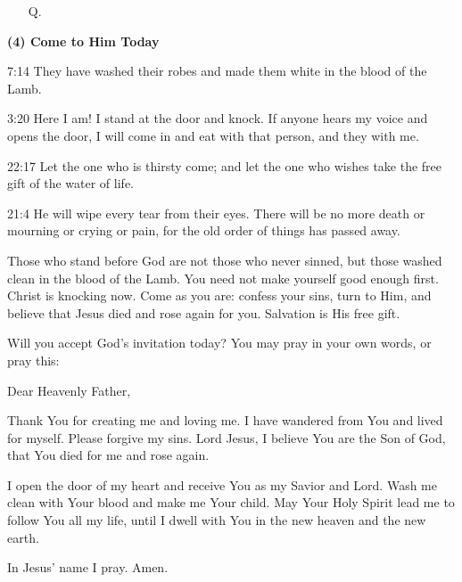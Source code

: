 \begin{center}
\begin{tcolorbox}
\begin{itemize}[leftmargin=2em, labelsep=0.3em]
\item[Q.] 
\end{itemize}

\vspace{0.3cm}
\textbf{(4) Come to Him Today}

\begin{ScriptureBox}
\item[7:14] They have washed their robes and made them white in the blood of the Lamb.
\item[3:20] Here I am! I stand at the door and knock. If anyone hears my voice and opens the door, I will come in and eat with that person, and they with me.
\item[22:17] Let the one who is thirsty come; and let the one who wishes take the free gift of the water of life.
\item[21:4] He will wipe every tear from their eyes. There will be no more death or mourning or crying or pain, for the old order of things has passed away.
\end{ScriptureBox}

Those who stand before God are not those who never sinned, but those washed clean in the blood of the Lamb. You need not make yourself good enough first. Christ is knocking now. Come as you are: confess your sins, turn to Him, and believe that Jesus died and rose again for you. Salvation is His free gift.

\vspace{0.3cm}

Will you accept God's invitation today? You may pray in your own words, or pray this:

\begin{tcolorbox}[
    width=\linewidth,
    colback=gray!5,
    colframe=gray!70,
    colbacktitle=gray!90,
    coltitle=white,
    title={A Prayer of Commitment},
    center title,
    boxrule=0.5pt,
    breakable,
    left=1pt,
    right=1pt,
    top=1pt,
    bottom=1pt
]
Dear Heavenly Father,

\hspace{0.5cm} Thank You for creating me and loving me. I have wandered from You and lived for myself. Please forgive my sins.
Lord Jesus, I believe You are the Son of God, that You died for me and rose again.

\hspace{0.5cm} I open the door of my heart and receive You as my Savior and Lord. Wash me clean with Your blood and make me Your child.
May Your Holy Spirit lead me to follow You all my life, until I dwell with You in the new heaven and the new earth.

\hspace{0.5cm} In Jesus' name I pray. Amen.
\end{tcolorbox}


\end{tcolorbox}
\end{center}
